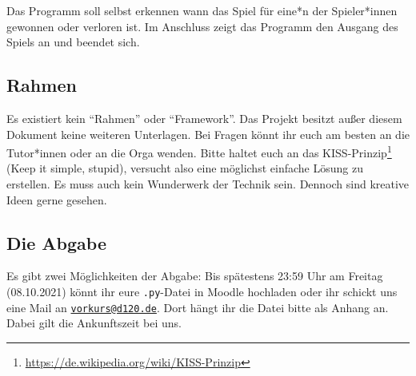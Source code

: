 Das Programm soll selbst erkennen wann das Spiel für eine*n der Spieler*innen gewonnen oder verloren ist.
Im Anschluss zeigt das Programm den Ausgang des Spiels an und beendet sich.

\subsection*{Rahmen}
Es existiert kein \enquote{Rahmen} oder \enquote{Framework}.
Das Projekt besitzt außer diesem Dokument keine weiteren Unterlagen.
Bei Fragen könnt ihr euch am besten an die Tutor*innen oder an die Orga wenden.
Bitte haltet euch an das KISS-Prinzip\footnote[2]{\url{https://de.wikipedia.org/wiki/KISS-Prinzip}} (Keep it simple, stupid), versucht also eine möglichst einfache Lösung zu erstellen.
Es muss auch kein Wunderwerk der Technik sein.
Dennoch sind kreative Ideen gerne gesehen.

\subsection*{Die Abgabe}
Es gibt zwei Möglichkeiten der Abgabe: Bis spätestens 23:59 Uhr am Freitag (08.10.2021) könnt ihr eure \texttt{.py}-Datei in Moodle hochladen oder ihr schickt uns eine Mail an \href{mailto:vorkurs@d120.de}{\nolinkurl{vorkurs@d120.de}}.
Dort hängt ihr die Datei bitte als Anhang an.
Dabei gilt die Ankunftszeit bei uns.

